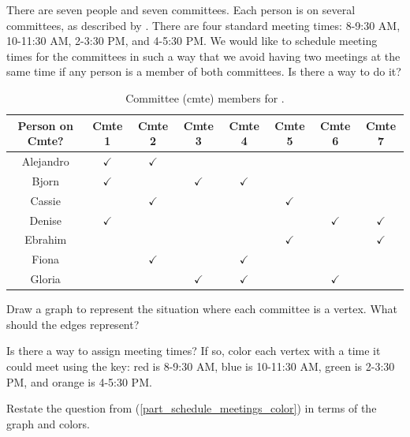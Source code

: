 \begin{exer}[\exerU] %
\label{exer_schedule_meetings}
    There are seven people and seven committees.  Each person is on several committees, as described by .  There are four standard meeting times: 8-9:30 AM, 10-11:30 AM, 2-3:30 PM, and 4-5:30 PM.  We would like to schedule meeting times for the committees in such a way that we avoid having two meetings at the same time if any person is a member of both committees.  Is there a way to do it?

    \begin{table}[ht]
        \centering
        \begin{tabular} {c |c |c |c |c |c |c |c}
            Person on Cmte?&  Cmte 1 & Cmte 2 & Cmte 3 & Cmte 4 & Cmte 5 & Cmte 6 & Cmte 7 \\ \hline
            Alejandro & $\checkmark$ & $\checkmark$ & &&&& \\ \hline
            Bjorn & $\checkmark$ &  &$\checkmark$ &$\checkmark$&&& \\ \hline
            Cassie &  & $\checkmark$ & &&$\checkmark$&& \\ \hline
            Denise & $\checkmark$ &  & &&&$\checkmark$&$\checkmark$ \\ \hline
            Ebrahim & & & && $\checkmark$&&$\checkmark$  \\ \hline
            Fiona &  & $\checkmark$ & &$\checkmark$&&& \\ \hline
            Gloria  &  & &$\checkmark$ &$\checkmark$&&$\checkmark$& \\ 
        \end{tabular}
        \caption{Committee (cmte) members for .}
        \label{table_committee_members}
    \end{table}
    \begin{exerpart}
        \item Draw a graph to represent the situation where each committee is a vertex.  What should the edges represent?
        \item \label{part_schedule_meetings_color} Is there a way to assign meeting times?  If so, color each vertex with a time it could meet using the key: red is 8-9:30 AM, blue is 10-11:30 AM, green is 2-3:30 PM, and orange is 4-5:30 PM.  
        \item Restate the question from (\ref{part_schedule_meetings_color}) in terms of the graph and colors.
    \end{exerpart}
\end{exer}


